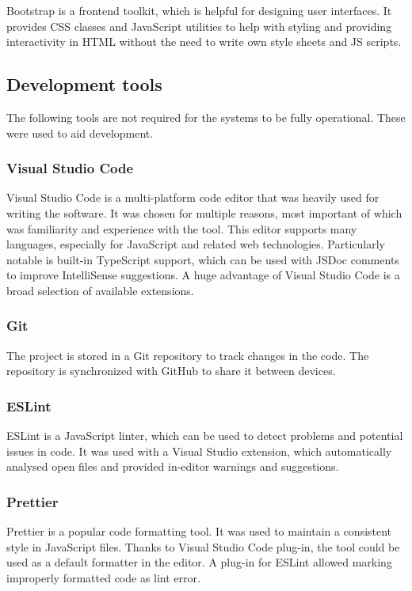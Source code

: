 Bootstrap is a frontend toolkit, which is helpful for designing user interfaces. It provides CSS classes and JavaScript utilities to help with styling and providing interactivity in HTML without the need to write own style sheets and JS scripts.

\subsection{Development tools}

The following tools are not required for the systems to be fully operational. These were used to aid development.

\subsubsection{Visual Studio Code}

Visual Studio Code is a multi-platform code editor that was heavily used for writing the software. It was chosen for multiple reasons, most important of which was familiarity and experience with the tool. This editor supports many languages, especially for JavaScript and related web technologies. Particularly notable is built-in TypeScript support, which can be used with JSDoc comments to improve IntelliSense suggestions. A huge advantage of Visual Studio Code is a broad selection of available extensions.

\subsubsection{Git}

The project is stored in a Git repository to track changes in the code. The repository is synchronized with GitHub to share it between devices.

\subsubsection{ESLint}

ESLint is a JavaScript linter, which can be used to detect problems and potential issues in code. It was used with a Visual Studio extension, which automatically analysed open files and provided in-editor warnings and suggestions.

\subsubsection{Prettier}

Prettier is a popular code formatting tool. It was used to maintain a consistent style in JavaScript files. Thanks to Visual Studio Code plug-in, the tool could be used as a default formatter in the editor. A plug-in for ESLint allowed marking improperly formatted code as lint error.

